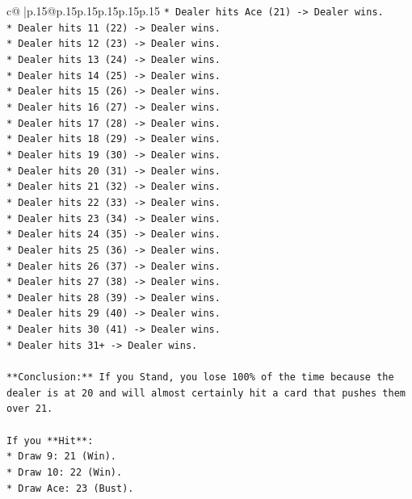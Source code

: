 \documentclass{article}
\begin{document}
{\begin{supertabular}{c@{$\;$}|p{.15\linewidth}@{}p{.15\linewidth}p{.15\linewidth}p{.15\linewidth}p{.15\linewidth}p{.15\linewidth}}
{{{\texttt{*   Dealer hits Ace (21) {-}> Dealer wins.} \\
\texttt{*   Dealer hits 11 (22) {-}> Dealer wins.} \\
\texttt{*   Dealer hits 12 (23) {-}> Dealer wins.} \\
\texttt{*   Dealer hits 13 (24) {-}> Dealer wins.} \\
\texttt{*   Dealer hits 14 (25) {-}> Dealer wins.} \\
\texttt{*   Dealer hits 15 (26) {-}> Dealer wins.} \\
\texttt{*   Dealer hits 16 (27) {-}> Dealer wins.} \\
\texttt{*   Dealer hits 17 (28) {-}> Dealer wins.} \\
\texttt{*   Dealer hits 18 (29) {-}> Dealer wins.} \\
\texttt{*   Dealer hits 19 (30) {-}> Dealer wins.} \\
\texttt{*   Dealer hits 20 (31) {-}> Dealer wins.} \\
\texttt{*   Dealer hits 21 (32) {-}> Dealer wins.} \\
\texttt{*   Dealer hits 22 (33) {-}> Dealer wins.} \\
\texttt{*   Dealer hits 23 (34) {-}> Dealer wins.} \\
\texttt{*   Dealer hits 24 (35) {-}> Dealer wins.} \\
\texttt{*   Dealer hits 25 (36) {-}> Dealer wins.} \\
\texttt{*   Dealer hits 26 (37) {-}> Dealer wins.} \\
\texttt{*   Dealer hits 27 (38) {-}> Dealer wins.} \\
\texttt{*   Dealer hits 28 (39) {-}> Dealer wins.} \\
\texttt{*   Dealer hits 29 (40) {-}> Dealer wins.} \\
\texttt{*   Dealer hits 30 (41) {-}> Dealer wins.} \\
\texttt{*   Dealer hits 31+ {-}> Dealer wins.} \\
\\ 
\texttt{**Conclusion:** If you Stand, you lose 100\% of the time because the dealer is at 20 and will almost certainly hit a card that pushes them over 21.} \\
\\ 
\texttt{If you **Hit**:} \\
\texttt{*   Draw 9: 21 (Win).} \\
\texttt{*   Draw 10: 22 (Win).} \\
\texttt{*   Draw Ace: 23 (Bust).} \\
}}}
\end{supertabular}}
\end{document}
